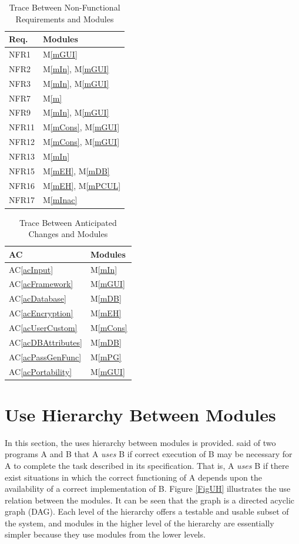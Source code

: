 \documentclass[12pt, titlepage]{article}
\newcommand{\acref}[1]{AC\ref{#1}}
\newcommand{\mref}[1]{M\ref{#1}}
\begin{document}
\begin{table}[H]
\centering
\begin{tabular}{p{} p{}}
\toprule
\textbf{Req.} & \textbf{Modules}\\
\midrule
NFR1 & \mref{mGUI}\\
NFR2 & \mref{mIn}, \mref{mGUI}\\
NFR3 & \mref{mIn}, \mref{mGUI}\\
NFR7 & \mref{m}\\
NFR9 & \mref{mIn}, \mref{mGUI}\\
NFR11 & \mref{mCons}, \mref{mGUI}\\
NFR12 & \mref{mCons}, \mref{mGUI}\\
NFR13 & \mref{mIn}\\
NFR15 & \mref{mEH}, \mref{mDB}\\
NFR16 & \mref{mEH}, \mref{mPCUL}\\
NFR17 & \mref{mInac}\\
\bottomrule
\end{tabular}
\caption{Trace Between Non-Functional Requirements and Modules}
\label{TblRT}
\end{table}

\begin{table}[H]
\centering
\begin{tabular}{p{} p{}}
\toprule
\textbf{AC} & \textbf{Modules}\\
\midrule
\acref{acInput} & \mref{mIn}\\
\acref{acFramework} & \mref{mGUI}\\
\acref{acDatabase} & \mref{mDB}\\
\acref{acEncryption} & \mref{mEH}\\
\acref{acUserCustom} & \mref{mCons}\\
\acref{acDBAttributes} & \mref{mDB}\\
\acref{acPassGenFunc} & \mref{mPG}\\
\acref{acPortability} & \mref{mGUI}\\
\bottomrule
\end{tabular}
\caption{Trace Between Anticipated Changes and Modules}
\label{TblACT}
\end{table}

\section{Use Hierarchy Between Modules} \label{SecUse}

In this section, the uses hierarchy between modules is
provided. \citet{Parnas1978} said of two programs A and B that A {\em uses} B if
correct execution of B may be necessary for A to complete the task described in
its specification. That is, A {\em uses} B if there exist situations in which
the correct functioning of A depends upon the availability of a correct
implementation of B.  Figure \ref{FigUH} illustrates the use relation between
the modules. It can be seen that the graph is a directed acyclic graph
(DAG). Each level of the hierarchy offers a testable and usable subset of the
system, and modules in the higher level of the hierarchy are essentially simpler
because they use modules from the lower levels.
\end{document}
